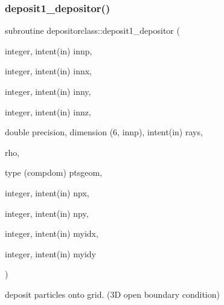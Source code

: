 \subsubsection{\texorpdfstring{deposit1\_depositor()}{deposit1\_depositor()}}
{\footnotesize\ttfamily subroutine depositorclass\+::deposit1\+\_\+depositor (\begin{DoxyParamCaption}\item[{integer, intent(in)}]{innp,  }\item[{integer, intent(in)}]{innx,  }\item[{integer, intent(in)}]{inny,  }\item[{integer, intent(in)}]{innz,  }\item[{double precision, dimension (6, innp), intent(in)}]{rays,  }\item[{}]{rho,  }\item[{type (compdom)}]{ptsgeom,  }\item[{integer, intent(in)}]{npx,  }\item[{integer, intent(in)}]{npy,  }\item[{integer, intent(in)}]{myidx,  }\item[{integer, intent(in)}]{myidy }\end{DoxyParamCaption})}



deposit particles onto grid. (3D open boundary condition) 

